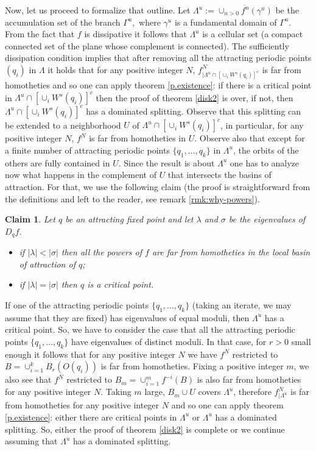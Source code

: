 \documentclass[a4paper,11pt]{article}
\newtheorem{claim}[lemma]{Claim}
\theoremstyle{definition}
\def\La{\Lambda}
\def\la{\lambda}
\def\Ga{\Gamma}
\def\La{\Lambda}
\def\Ga{\Gamma}
\def\si{\sigma}
\begin{document}
\medskip

Now, let us proceed to formalize that outline. Let $\La^u:= \overline{\cup_{n>0} f^n(\gamma^u)}$  be the accumulation set of the branch $\Ga^u,$ where $\gamma^u$ is a fundamental domain of $\Gamma^u$.   From the fact that $f$ is dissipative it follows that $\Lambda^u$ is a cellular set (a compact connected set of the plane  whose  complement is connected). The sufficiently dissipation condition implies that after removing all the attracting periodic points $(q_i)$ in $\La$ it holds that  for any positive integer $N$, $f^N_{|\La^u\cap [\cup_{i} W^s(q_i)]^c}$ 
is far from homotheties and so one can apply theorem \ref{p.existence}: if there is a critical point in $\La^u\cap [\cup_{i} W^s(q_i)]^c$ then the proof of theorem \ref{disk2} is over, if not, then $\La^u\cap [\cup_{i} W^s(q_i)]^c$ has a dominated splitting.    Observe that this splitting can be extended to a neighborhood $U$ of $\La^u\cap [\cup_{i} W^s(q_i)]^c$, in particular, for any positive integer $N$, $f^N$ is far from homotheties in $U.$  Observe also that except for   a finite number of attracting periodic points $\{q_1, \dots, q_k\}$ in $\La^u$, the orbits of the others are fully contained in $U$. Since the result is about $\La^u$ one has to analyze now what happens in the complement  of $U$ that intersects the basins of attraction. For that, we use the following claim (the proof is straightforward from the definitions and left to the reader, see remark \ref{rmk:why-powers}).

\begin{claim}\label{cl:att-fp} Let $q$ be an attracting fixed point and let $\la$ and $\si$ be the eigenvalues of $D_qf.$
\begin{itemize}
    \item[--] if $|\la|<|\si|$ then all the powers of $f$ are far from homotheties in the local basin of attraction of $q$;

     \item[--] if $|\la|=|\si|$ then  $q$ is a critical point.
\end{itemize}
    
\end{claim}

If one of the attracting periodic points $\{q_1, \dots, q_k\}$ (taking an iterate, we may  assume that they  are   fixed) has  eigenvalues of equal moduli, then $\La^u$  has a critical point. So, we have to consider the case that all the attracting  periodic points $\{q_1, \dots, q_k\}$  have eigenvalues of distinct moduli. In that case, for $r>0$ small enough it follows that for any positive integer $N$ we have $f^N$ restricted to $B=\cup_{i=1}^k B_{r}(O(q_i))$   is far from homotheties.  Fixing a positive integer $m$, we also see that $f^N$ restricted to $B_m=\cup_{i=1}^mf^{-i}(B)$ is also far from homotheties for any positive integer $N$.  Taking $m$ large, $B_m\cup U$ covers $\La^u$, therefore $f^N_{|\La^u}$ is far from homotheties for any positive integer $N$ and so one can apply theorem \ref{p.existence}: either there are critical points in $\La^u$ or $\La^u$ has a dominated splitting. So, either the proof of theorem \ref{disk2} is complete or we continue assuming that $\La^u$ has a dominated splitting.
\end{document}
